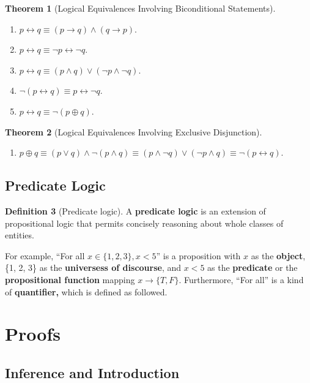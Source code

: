 \documentclass[12pt,a4paper]{report}
\theoremstyle{definition}
\newtheorem{theorem}{Theorem}[section]
\newtheorem{definition}[theorem]{Definition}
\theoremstyle{remark}
\begin{document}
\begin{theorem}[Logical Equivalences Involving Biconditional Statements]
    \mbox{}
\begin{enumerate}
    \item $p \leftrightarrow q \equiv (p \rightarrow q) \land (q \rightarrow p).$
    \item $p \leftrightarrow q \equiv \neg p \leftrightarrow \neg q.$
    \item $p \leftrightarrow q \equiv (p \land q) \lor (\neg p \land \neg q).$
    \item $\neg(p \leftrightarrow q) \equiv p \leftrightarrow \neg q.$
    \item $p \leftrightarrow q \equiv \neg(p \oplus q).$
\end{enumerate}
\end{theorem}

\begin{theorem}[Logical Equivalences Involving Exclusive Disjunction]
\mbox{}
\begin{enumerate}
    \item $p \oplus q \equiv (p \lor q) \land \neg(p \land q) \equiv (p \land \neg q) \lor (\neg p \land q) \equiv \neg (p \leftrightarrow q).$
\end{enumerate}
\end{theorem}

\section{Predicate Logic}

\begin{definition}[Predicate logic]
    A \textbf{predicate logic} is an extension of propositional logic that permits concisely reasoning about whole classes of entities.
\end{definition}

For example, ``For all $x \in \{1, 2, 3\}, x < 5$'' is a proposition with $x$ as the \textbf{object}, \{1, 2, 3\} as the \textbf{universess of discourse}, and $x < 5$ as the \textbf{predicate} or the \textbf{propositional function} mapping $x \to \{T, F\}.$ Furthermore, ``For all'' is a kind of \textbf{quantifier,} which is defined as followed.

\chapter{Proofs}

\section{Inference and Introduction}
\end{document}
